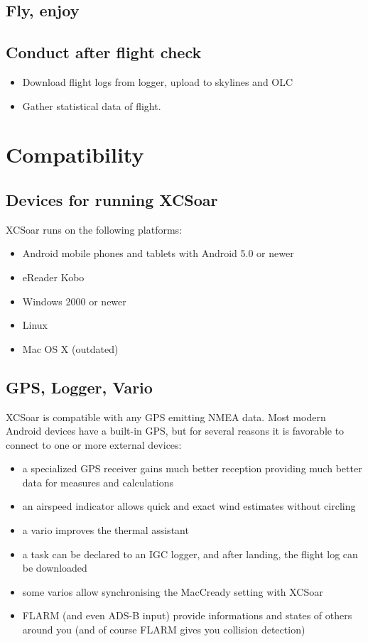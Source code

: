 \subsection*{Fly, enjoy}
\vspace{4em}

\subsection*{Conduct after flight check}
\begin{itemize}
\item Download flight logs from logger, upload to skylines and OLC
\item Gather statistical data of flight.
\end{itemize}
\newpage




\section{Compatibility}

\subsection*{Devices for running XCSoar}

XCSoar runs on the following platforms:

\begin{itemize}
\item Android mobile phones and tablets with Android 5.0 or newer 
\item eReader Kobo
\item Windows 2000 or newer
\item Linux
\item Mac OS X (outdated)
\end{itemize}

\subsection*{GPS, Logger, Vario}

XCSoar is compatible with any GPS emitting NMEA data.  Most modern
Android devices have a built-in GPS, but for several reasons it is favorable to
connect to one or more external devices:

\begin{itemize}
\item a specialized GPS receiver gains much better reception providing much 
better data for measures and calculations
\item an airspeed indicator allows quick and exact wind estimates
  without circling
\item a vario improves the thermal assistant
\item a task can be declared to an IGC logger, and after landing, the
  flight log can be downloaded
\item some varios allow synchronising the MacCready setting with
  XCSoar
\item FLARM (and even ADS-B input) provide informations and states of others
around you (and of course FLARM gives you collision detection)
\end{itemize}

